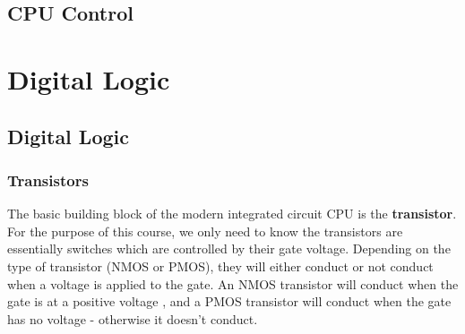 \documentclass{article}
\begin{document}
	\subsection{CPU Control}
	
	\section{Digital Logic}
	\subsection{Digital Logic}
	\subsubsection{Transistors}
	The basic building block of the modern integrated circuit CPU is the \textbf{transistor}. For the purpose of this course, we only need to know the transistors are essentially switches which are controlled by their gate voltage. Depending on the type of transistor (NMOS or PMOS), they will either conduct or not conduct when a voltage is applied to the gate. An NMOS transistor will conduct when the gate is at a positive voltage , and a PMOS transistor will conduct when the gate has no voltage - otherwise it doesn't conduct.
	
\end{document}
